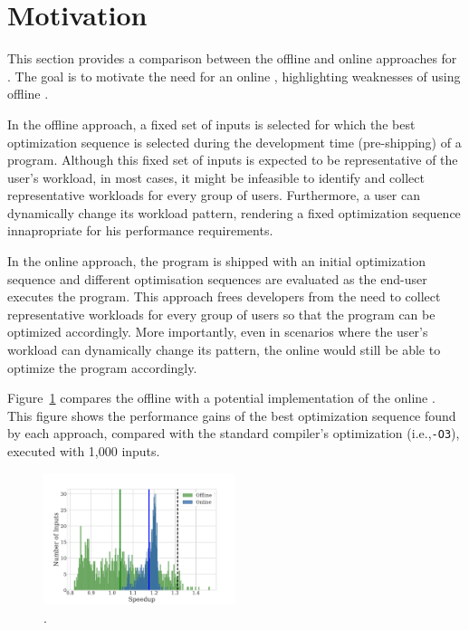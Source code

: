 \section{Motivation}



This section provides a comparison between the offline and online approaches for
{\itercomp}.
The goal is to motivate the need for an online {\itercomp}, highlighting
weaknesses of using offline {\itercomp}.

In the offline approach, a fixed set of inputs is selected for which the best
optimization sequence is selected during the development time (pre-shipping) of
a program.
Although this fixed set of inputs is expected to be representative of the user's
workload,
in most cases, it might be infeasible to identify and collect representative
workloads for every group of users.
Furthermore, a user can dynamically change its workload pattern, rendering
a fixed optimization sequence innapropriate for his performance requirements.

In the online approach, the program is shipped with an initial optimization
sequence and different optimisation sequences are evaluated as the end-user
executes the program.
This approach frees developers from the need to collect representative
workloads for every group of users so that the program can be optimized
accordingly.
More importantly, even in scenarios where the user's workload can dynamically
change its pattern, the online {\itercomp} would still be able to optimize the
program accordingly.

Figure~\ref{fig:motivation} compares the offline {\itercomp} with a potential
implementation of the online {\itercomp}.
This figure shows the performance gains of the best optimization 
sequence found by each approach, compared with the standard
compiler's optimization (i.e.,\texttt{-O3}), executed with 1,000 inputs.


\begin{figure}[ht]
    \centering
    \includegraphics[width=0.5\textwidth]{figs/motivation.pdf}
    \caption{.}
    \label{fig:motivation}
\end{figure}
